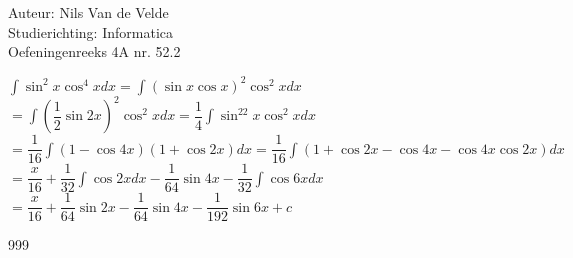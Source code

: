 \documentclass[a4paper]{article}
\begin{document}
\newcommand{\dint}{\displaystyle\int}
  
\noindent \large Auteur: Nils Van de Velde \\
\noindent \large Studierichting: Informatica\\
\noindent \large Oefeningenreeks 4A nr. 52.2\\

\medskip

\normalsize

$\dint\sin^2x\cos^4xdx=\dint(\sin x\cos x)^2\cos^2xdx$\\

$=\dint\left(\dfrac{1}{2}\sin2x\right)^2\cos^2xdx=\dfrac{1}{4}\dint\sin^22x\cos^2xdx$\\

$=\dfrac{1}{16}\dint(1-\cos4x)(1+\cos2x)dx=\dfrac{1}{16}\dint(1+\cos2x-\cos4x-\cos4x\cos2x)dx$\\

$=\dfrac{x}{16}+\dfrac{1}{32}\dint\cos2xdx-\dfrac{1}{64}\sin4x-\dfrac{1}{32}\dint\cos6xdx$\\

$=\dfrac{x}{16}+\dfrac{1}{64}\sin2x-\dfrac{1}{64}\sin4x-\dfrac{1}{192}\sin6x+c$\\

\begin{thebibliography}{999}
\end{thebibliography}
\end{document}
